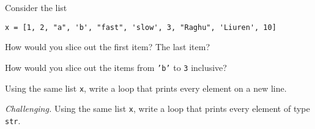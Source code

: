 \documentclass[11pt]{exam}
\begin{document}
\begin{questions}
\item Consider the list
\begin{verbatim}
x = [1, 2, "a", 'b', "fast", 'slow', 3, "Raghu", 'Liuren', 10]
\end{verbatim}
\begin{parts}
\item How would you slice out the first item?  The last item?
\item How would you slice out the items from {\tt 'b'} to {\tt 3} inclusive?
\end{parts}

\item Using the same list {\tt x}, write a loop that prints every element on a new line.

\item {\it Challenging.\/}
Using the same list {\tt x}, write a loop that prints every element of type {\tt str}.


\begin{comment}
\item Suppose the current price of corn is \$1.20.
The price is set to increase by 10 cents every weekday until it hits \$2.50.
(Nothing happens on weekends.)
At that point it will switch directions and decrease by 10 cents a day.
Finish the code below to print the price of corn every day until it reaches \$2.50.
\begin{verbatim}
days = ["M", "T", "W", "Th", "F"]
starting_price = 1.20
current_price = starting_price
while True:
for day in days:
    current_price = current_price + 0.10
    print("The price on ", day, "is ", current_price)
if current_price == 2.50:
    break
\end{verbatim}
\end{comment}






\end{questions}
\end{document}

